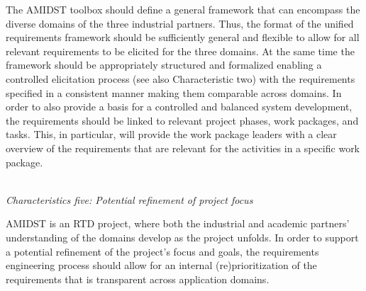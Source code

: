 \noindent The AMIDST toolbox should define a general framework that can encompass the diverse domains of the three industrial
partners. Thus, the format of the unified requirements framework should be sufficiently general and flexible to
allow for all relevant requirements to be elicited for the three domains. At the same time the framework should be
appropriately structured and formalized enabling a controlled elicitation process (see also Characteristic two) with the
requirements specified in a consistent manner making them comparable across domains. In order to also provide a basis 
for a controlled and
balanced system development, the requirements should be linked to
relevant project phases, work packages, and tasks. This, in particular, will provide the work package leaders with
a clear overview of the requirements that are relevant for the activities in a specific work package.   
%
%

\ \\
\noindent \emph{Characteristics five: Potential refinement of project focus}
\label{sec:characteristic5}

\noindent AMIDST is an RTD project, where both the industrial and academic partners' understanding of the domains develop as
the project unfolds. In order to support a potential refinement of the project's focus and goals, the requirements
engineering process should allow for an internal (re)prioritization of the requirements that is transparent across
application domains.    



%

